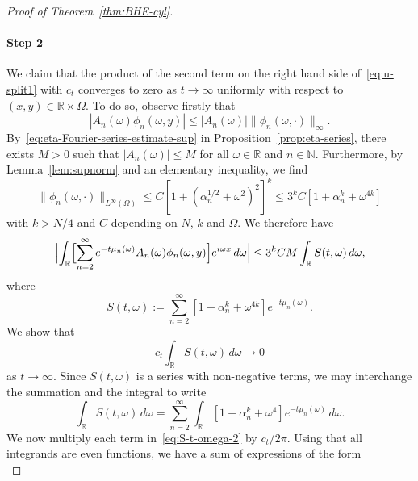 \documentclass[a4paper, reqno]{amsart}
\numberwithin{equation}{section}
\theoremstyle{plain}
\theoremstyle{definition}
\theoremstyle{remark}
\newcommand{\NN}{\mathbb{N}}
\newcommand{\RR}{\mathbb{R}}
\begin{document}
\begin{proof}[Proof of Theorem~\ref{thm:BHE-cyl}]
  \paragraph{Step 2}
  We claim that the product of the second term on the right hand side of~\eqref{eq:u-split1} with $c_t$ converges to zero as $t \to \infty$ uniformly with respect to $(x,y) \in \RR \times   \Omega$. To do so, observe firstly that
  \begin{equation*}
    \left|A_n(\omega) \phi_n(\omega, y)\right| \leq |A_n(\omega)| \|\phi_n(\omega,\cdot)\|_\infty.
  \end{equation*}
  By~\eqref{eq:eta-Fourier-series-estimate-sup} in Proposition~\ref{prop:eta-series}, there exists $M>0$ such that $|A_n(\omega)|\leq M$ for all $\omega\in\RR$ and $n \in \NN$. Furthermore, by Lemma~\ref{lem:supnorm} and an elementary inequality, we find
  \begin{equation}
    \label{eq:phi-n-expand}
    \|\phi_n(\omega, \cdot) \|_{L^\infty(\Omega)}
    \leq C \left[ 1+(\alpha_n^{1/2} +\omega^2)^2 \right]^k
    \leq 3^{k}C\left[ 1+\alpha_n^{k} +\omega^{4k} \right]
  \end{equation}
  with $k>N/4$ and $C$ depending on $N$, $k$ and $\Omega$. We therefore have
  \begin{equation*}
    \Bigl|\int_{\RR} \Bigl[ \sum_{n=2}^\infty e^{-t \mu_n(\omega)} A_n(\omega) \phi_n(\omega, y) \Bigr] e^{i \omega x} \,d\omega\Bigr|
    \leq 3^{k}CM\int_{\RR}S(t, \omega) \,d\omega,
  \end{equation*}
  where
  \begin{equation*}
    S(t, \omega) := \sum_{n = 2}^\infty \left[ 1+\alpha_n^k +\omega^{4k} \right]e^{ -t\mu_n(\omega) }.
  \end{equation*}
  We show that
  \begin{equation}
    \label{eq:S-t-omega}
    c_t \int_\RR S(t, \omega) \,d\omega \longrightarrow 0
  \end{equation}
  as $t \to \infty$. Since $S(t, \omega)$ is a series with non-negative terms, we may interchange the summation and the integral to write
  \begin{equation}
    \label{eq:S-t-omega-2}
    \int_\RR S(t, \omega) \,d\omega
    = \sum_{n = 2}^\infty\int_\RR \left[1+\alpha_n^k+\omega^4\right] e^{-t \mu_n(\omega)} \,d\omega.
  \end{equation}
  We now multiply each term in~\eqref{eq:S-t-omega-2} by $c_t/2\pi$. Using that all integrands are even functions, we have a sum of expressions of the form
  \begin{equation*}

\end{equation*}
\end{proof}
\end{document}
